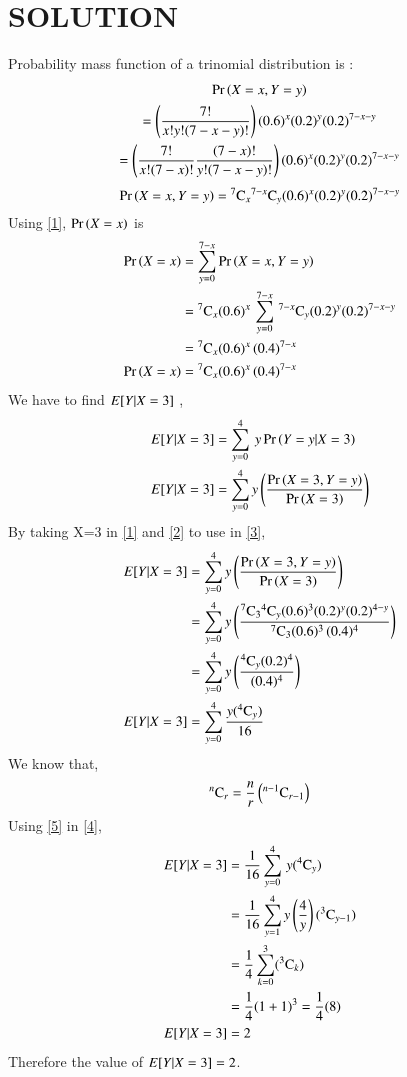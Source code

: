 \documentclass[journal,12pt,twocolumn]{IEEEtran}
\begin{document}
\section{SOLUTION}
Probability mass function of a trinomial  distribution is :
\begin{multline}
   \Pr\left(X=x,Y=y\right) \\=\left(\frac{7!}{x!y!(7-x-y)!}\right)(0.6)^x(0.2)^y(0.2)^{7-x-y}\\
  \nonumber  =\left(\frac{7!}{x!(7-x)!}\frac{(7-x)!}{y!(7-x-y)!}\right)(0.6)^x(0.2)^y(0.2)^{7-x-y}
\end{multline}
\begin{equation}
    \Pr\left(X=x,Y=y\right)={}^{7}\mathrm{C}_{x}{}^{7-x}\mathrm{C}_{y}(0.6)^x(0.2)^y(0.2)^{7-x-y}\label{1}
\end{equation}
Using \eqref{1}, $\Pr\left(X=x\right)$ is 
\begin{align}
   \nonumber \Pr\left(X=x\right)&=\sum_{y=0}^{7-x} \Pr\left(X=x,Y=y\right)\\
  \nonumber &={}^{7}\mathrm{C}_{x}(0.6)^x\,\sum_{y=0}^{7-x}\, {}^{7-x}\mathrm{C}_{y} (0.2)^y(0.2)^{7-x-y} \\
  \nonumber  &={}^{7}\mathrm{C}_{x}(0.6)^x\,{(0.4)^{7-x}}\\
    \Pr\left(X=x\right)&={}^{7}\mathrm{C}_{x}(0.6)^x\,{(0.4)^{7-x}}\label{2}
\end{align}
We have to find $E[ Y|X=3 ]$ ,
\begin{align}
    E[ Y|X=3 ]&=\sum_{y=0}^4 \: y \Pr\left(Y=y|X=3\right)\\
    E[ Y|X=3 ]&=\sum_{y=0}^4 y \left(  \frac{ \Pr\left(X=3,Y=y\right)}{\Pr\left(X=3\right)} \right)\label{3}
\end{align}
By taking X=3 in \eqref{1} and \eqref{2}  to use in \eqref{3},
\begin{align}
   \nonumber E[ Y|X=3 ]&=\sum_{y=0}^4 y \left( \frac{ \Pr\left(X=3,Y=y\right)}{\Pr\left(X=3\right)}\right)\\
  \nonumber  &=\sum_{y=0}^4 y   \left(\frac{{}^{7}\mathrm{C}_{3}{}^{4}\mathrm{C}_{y}(0.6)^3(0.2)^y(0.2)^{4-y}}{{}^{7}\mathrm{C}_{3}(0.6)^3\,{(0.4)^{4}}}\right)\\
 \nonumber &=\sum_{y=0}^4 y   \left(\frac{{}^{4}\mathrm{C}_{y}(0.2)^{4}}{{(0.4)^{4}}}\right)\\
 E[ Y|X=3 ]&=\sum_{y=0}^4 {\frac{y({}^{4}\mathrm{C}_{y})}{{16}}}\label{4}
 \end{align}
 We know that,
 \begin{align}
     {}^{n}\mathrm{C}_{r} = \frac{n}{r}\left({}^{n-1}\mathrm{C}_{r-1}\right)\label{5}
 \end{align}
 Using \eqref{5} in \eqref{4},
 \begin{align}
  E[ Y|X=3 ]&=\frac{1}{16}\sum_{y=0}^4\, {y({}^{4}\mathrm{C}_{y})}\\
  &=\frac{1}{16}\sum_{y=1}^{4} y\left(\frac{4}{y}\right)({}^{3}\mathrm{C}_{y-1})\\
  &=\frac{1}{4}\sum_{k=0}^{3}({}^{3}\mathrm{C}_{k})\\
  &=\frac{1}{4}(1+1)^3=\frac{1}{4}(8)\\
  E[ Y|X=3 ]&=2
\end{align}
Therefore the value of $E[ Y|X=3 ]=2$.
\end{document}
